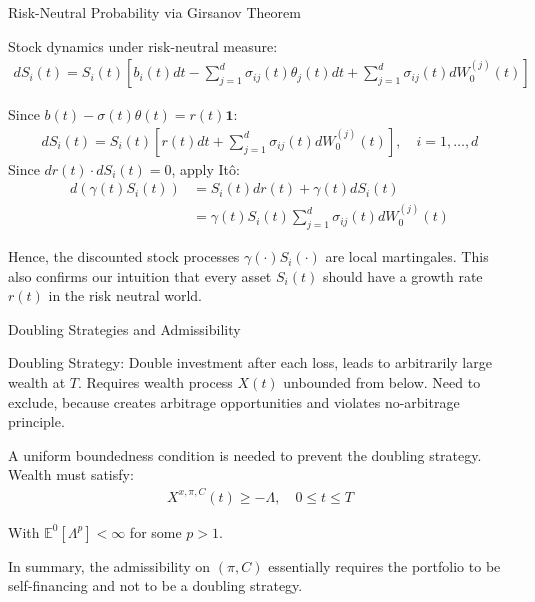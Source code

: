\documentclass{beamer}
\begin{document}
\begin{frame}{Risk-Neutral Probability via Girsanov Theorem}

    {\footnotesize \footnotesize
    \par Stock dynamics under risk-neutral measure:
    \begin{align*}
        dS_i(t) = S_i(t) \left[ b_i(t)dt - \sum_{j=1}^d \sigma_{ij}(t)\theta_j(t)dt + \sum_{j=1}^d \sigma_{ij}(t)dW_0^{(j)}(t) \right]
    \end{align*}
    \par Since $b(t) - \sigma(t)\theta(t) = r(t)\mathbf{1}$:
    \begin{align*}
        dS_i(t) = S_i(t) \left[r(t)dt + \sum_{j=1}^d \sigma_{ij}(t)dW_0^{(j)}(t) \right], \quad i = 1, \ldots, d
    \end{align*}
    Since $dr(t) \cdot dS_i(t) = 0$, apply Itô:
    \begin{align*}
        d(\gamma(t)S_i(t)) &= S_i(t)dr(t) + \gamma(t)dS_i(t) \\
        &= \gamma(t)S_i(t) \sum_{j=1}^d \sigma_{ij}(t)dW_0^{(j)}(t)
    \end{align*}
    \par Hence, the discounted stock processes $\gamma(\cdot)S_i(\cdot)$ are local martingales.
     This also confirms our intuition that every asset $S_i(t)$ should have a growth rate $r(t)$ in the risk neutral world.
    }   
\end{frame} 

\begin{frame}{Doubling Strategies and Admissibility}

    {\footnotesize \footnotesize
    \par Doubling Strategy: Double investment after each loss, leads to arbitrarily large wealth at $T$. 
    Requires wealth process $X(t)$ unbounded from below. Need to exclude, because creates arbitrage opportunities and 
    violates no-arbitrage principle.
    \vspace{1em}
    \par A uniform boundedness condition is needed to prevent the doubling strategy. Wealth must satisfy:
    \begin{align*}
        X^{x,\pi,C}(t) \geq -\Lambda, \quad 0 \leq t \leq T
    \end{align*}
    \par  With $\mathbb{E}^0[\Lambda^p] < \infty$ for some $p > 1$.
    \vspace{1em}
    \par In summary, the admissibility on $(\pi,C)$ essentially requires the portfolio to
    be self-financing and not to be a doubling strategy.
    }
\end{frame} 
\end{document}
